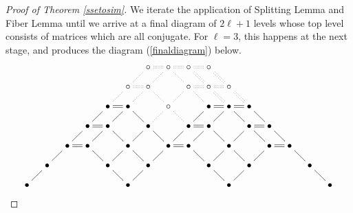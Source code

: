 \documentclass{amsart}
\theoremstyle{definition}
\theoremstyle{remark}
\numberwithin{equation}{section}
\begin{document}
{{\begin{proof}[Proof of Theorem 
\ref{ssetosim}]
We iterate the application of Splitting Lemma and Fiber Lemma
 until we arrive at a final diagram of $2\ell +1$ levels
whose top level consists of 
matrices which are all conjugate. For $\ell =3$, this happens at
 the next stage, and produces the diagram (\ref{finaldiagram}) below. 
\begin{equation}\label{finaldiagram}
  \xymatrix@=10pt{
    &                        &                            &                            &         & 
& \circ \ar@{.}[dl]\ar@{:}[r] &    \circ \ar@{.}[dl]\ar@{.}[dr]\ar@{:}[r]   &\circ \ar@{:}[dr]\ar@{:}[r]  &\circ    \ar@{:}[dr]  &   
&&    &                 &                & \\
    &                        &                            &                            &         & 
 \circ \ar@{.}[dl]\ar@{:}[r] &    \circ \ar@{.}[dl]\ar@{.}[dr] & &  \circ \ar@{.}[dl]\ar@{.}[dr]
\ar@{:}[r]   &\circ \ar@{:}[r] \ar@{:}[dr]  & \circ  \ar@{:}[dr] 
 &  &     &                 &                & \\
    &                        &                            &                            & \bullet  \ar@{-}[dl]  \ar@{=}[r]   & 
 \bullet \ar@{-}[dl]\ar@{-}[dr] &  &  \circ \ar@{.}[dl]\ar@{.}[dr]  &  &\bullet    \ar@{-}[dl] \ar@{=}[r]               & 
 \bullet \ar@{-}[dl]\ar@{-}[dr]\ar@{=}[r] &\bullet  \ar@{-}[dr]  &     &                 &                & \\
    &                        &          & \bullet  \ar@{-}[dl] \ar@{=}[r] & \bullet \ar@{-}[dl]\ar@{-}[dr] & 
    & \bullet \ar@{-}[dl]\ar@{-}[dr]  &         & \bullet  \ar@{-}[dl] \ar@{=}[r] & \bullet \ar@{-}[dl]\ar@{-}[dr] & 
    & \bullet \ar@{-}[dl]\ar@{-}[dr]\ar@{=}[r]  & \bullet  \ar@{-}[dr]                &                  &                & \\
    &                        & \bullet \ar@{-}[dl] \ar@{=}[r] & \bullet \ar@{-}[dr] &                & \bullet \ar@{-}[dl]\ar@{-}[dr]
    &                        & \bullet  \ar@{-}[dl]\ar@{=}[r] & \bullet \ar@{-}[dr] &                & \bullet \ar@{-}[dl]\ar@{-}[dr]
    &                        & \bullet  \ar@{-}[dl]\ar@{=}[r] & \bullet \ar@{-}[dr] &                & \\
    & \bullet        \ar@{-}[dl] &                             &               & \bullet \ar@{-}[dr] &  
    & \bullet        \ar@{-}[dl] &                             &               & \bullet \ar@{-}[dr] &  
    & \bullet        \ar@{-}[dl] &                             &               & \bullet \ar@{-}[dr] &  \\
 \bullet &                    &                             &               &                 &   \bullet
         &                    &                             &               &                 &   \bullet 
          &                    &                             &               &                 &   \bullet 
}
\end{equation} 


\end{proof}}}
\end{document}
